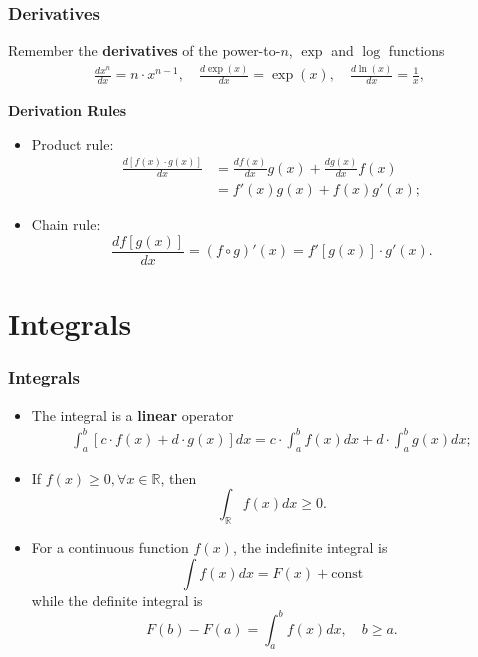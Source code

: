 \documentclass[notes=show]{beamer}\usepackage[]{graphicx}\usepackage[]{color}
\newcommand{\bea}{\begin{eqnarray}}
\newcommand{\eea}{\end{eqnarray}}
\newcommand{\nn}{\nonumber}
\begin{document}
\begin{frame}
\frametitle{Derivatives}

Remember the \textbf{derivatives} of the power-to-$n$, $\exp$ and $\log$ functions
\bea
 \frac{d x^n}{dx} = n \cdot x^{n-1}, \quad \frac{d \exp(x)}{dx} = \exp(x) , \quad
\frac{d \ln({x})}{dx} = \frac{1}{x}, \nn
\eea

\pause

\textbf{Derivation Rules}

\begin{itemize}
\item Product rule:
\begin{align*}
\frac{d [f(x)\cdot g(x)]}{dx} &= \frac{df(x)}{dx} g(x) + \frac{dg(x)}{dx} f(x) \nn \\
&= f'(x) g(x)+ f(x) g'(x) \nn ;
\end{align*}
\pause
\item Chain rule: $$ \frac{d f[g(x)]}{dx} =  (f\circ g)'(x) = f'[g(x)] \cdot g'(x). $$
\end{itemize}
\end{frame}

\section{Integrals}
\begin{frame}
\frametitle{Integrals}

\begin{itemize}
\item The integral is a \textbf{linear} operator
\bea
\int_{a}^{b} \left[c \cdot f(x) + d \cdot g(x) \right]dx = c  \cdot \int_{a}^{b}   f(x) dx + d \cdot \int_{a}^{b}   g(x) dx; \nn
\eea
\pause
\item If $f(x) \geq 0, \forall x \in \mathbb{R}$, then
$$ \int_{\mathbb{R}} f(x) dx \geq 0. $$
\pause
\item For a continuous function $f(x)$, the indefinite integral is
$$
\int f(x) dx = F(x) + \text{const}
$$
while the definite integral is
$$
F(b)-F(a)= \int_{a}^{b} f(x) dx, \quad b \geq a.
$$
\end{itemize}
\end{frame}
\end{document}
